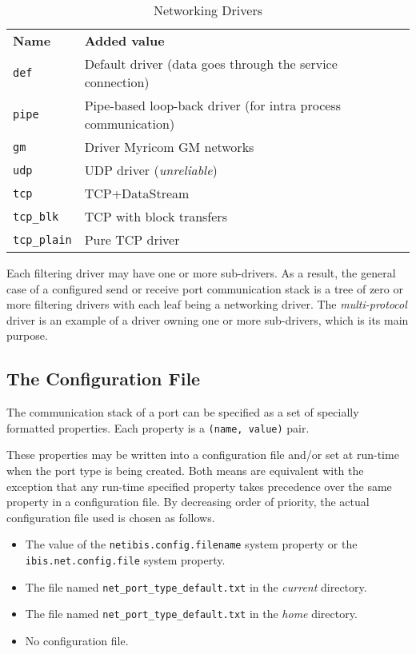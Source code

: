 \documentclass[11pt]{book}
\def\sep{\\[0.5ex]}
\begin{document}
\begin{table}[htbp]
  \centering
  \begin{tabular}{p{2cm}p{10cm}}
    \hline
    \textbf{Name}    & \textbf{Added value} \sep
    \texttt{def}        & Default driver (data goes through the service connection)\sep
    \texttt{pipe}       & Pipe-based loop-back driver (for intra process communication)\\
    \texttt{gm}         & Driver Myricom GM networks\\
    \texttt{udp}        & UDP driver (\emph{unreliable}) \sep
    \texttt{tcp}        & TCP+DataStream\\
    \texttt{tcp\_blk}   & TCP with block transfers\\
    \texttt{tcp\_plain} & Pure TCP driver\\
    \hline
  \end{tabular}
  \caption{Networking Drivers}
  \label{tab:net-drivers}
\end{table}

Each filtering driver may have one or more sub-drivers. As a result,
the general case of a configured send or receive port communication
stack is a tree of zero or more filtering drivers with each leaf being
a networking driver. The \textit{multi-protocol} driver is an example
of a driver owning one or more sub-drivers, which is its main purpose.

\subsection{The Configuration File}
\label{sec:configuration-file}

The communication stack of a port can be specified as a set of
specially formatted properties. Each property is a \texttt{(name,
  value)} pair.

These properties may be written into a configuration file and/or set
at run-time when the port type is being created. Both means are
equivalent with the exception that any run-time specified property
takes precedence over the same property in a configuration file. By
decreasing order of priority, the actual configuration file used is
chosen as follows.

\begin{itemize}
\item The value of the \texttt{netibis.config.filename} system
  property or the \texttt{ibis.net.config.file} system property.
\item The file named \texttt{net\_port\_type\_default.txt} in the
  \emph{current} directory.
\item The file named \texttt{net\_port\_type\_default.txt} in the
  \emph{home} directory.
\item No configuration file.
\end{itemize}
\end{document}
